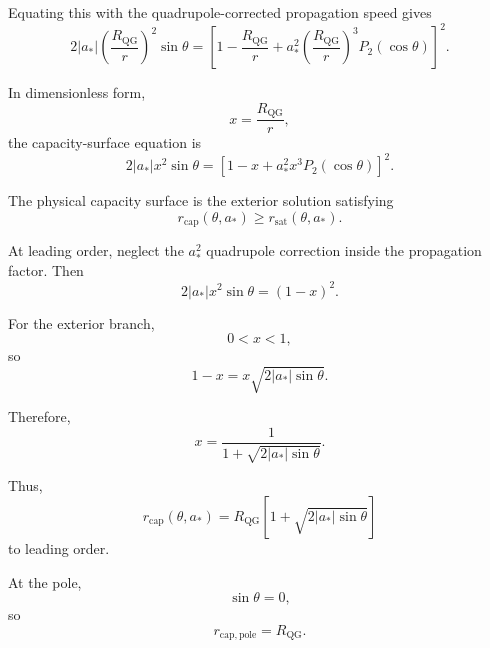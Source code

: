 Equating this with the quadrupole-corrected propagation speed gives
\begin{equation}
    2|a_\ast| \left( \frac{R_{\mathrm{QG}}}{r} \right)^2 \sin\theta = \left[ 1 - \frac{R_{\mathrm{QG}}}{r} + a_\ast^2 \left( \frac{R_{\mathrm{QG}}}{r} \right)^3 P_2(\cos\theta) \right]^2.
\end{equation}

In dimensionless form,
\begin{equation}
    x = \frac{R_{\mathrm{QG}}}{r},
\end{equation}
the capacity-surface equation is
\begin{equation}
    \boxed{ 2|a_\ast|x^2\sin\theta = \left[ 1-x+a_\ast^2x^3P_2(\cos\theta) \right]^2. }
\end{equation}

The physical capacity surface is the exterior solution satisfying
\begin{equation}
    r_{\mathrm{cap}}(\theta,a_\ast) \geq r_{\mathrm{sat}}(\theta,a_\ast).
\end{equation}

At leading order, neglect the $a_\ast^2$ quadrupole correction inside the propagation factor. Then
\begin{equation}
    2|a_\ast|x^2\sin\theta = (1-x)^2.
\end{equation}

For the exterior branch,
\begin{equation}
    0 < x < 1,
\end{equation}
so
\begin{equation}
    1-x = x\sqrt{2|a_\ast|\sin\theta}.
\end{equation}

Therefore,
\begin{equation}
    x = \frac{1}{ 1+\sqrt{2|a_\ast|\sin\theta} }.
\end{equation}

Thus,
\begin{equation}
    \boxed{ r_{\mathrm{cap}}(\theta,a_\ast) = R_{\mathrm{QG}} \left[ 1+\sqrt{2|a_\ast|\sin\theta} \right] }
\end{equation}
to leading order.

At the pole,
\begin{equation}
    \sin\theta = 0,
\end{equation}
so
\begin{equation}
    \boxed{ r_{\mathrm{cap,pole}} = R_{\mathrm{QG}}. }
\end{equation}

